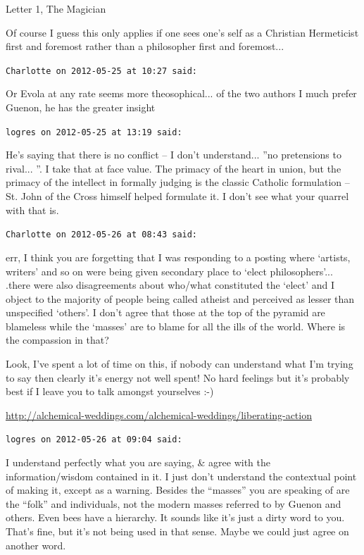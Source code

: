 \begin{footnotesize}
\begin{sffamily}
Letter 1, The Magician

Of course I guess this only applies if one sees one's self as a Christian Hermeticist first and foremost rather than a philosopher first and foremost...

\hfill

\texttt{Charlotte on 2012-05-25 at 10:27 said:}

Or Evola at any rate seems more theosophical... of the two authors I much prefer Guenon, he has the greater insight

\hfill

\texttt{logres on 2012-05-25 at 13:19 said:}

He's saying that there is no conflict -- I don't understand... ''no pretensions to rival... ''. I take that at face value. The primacy of the heart in union, but the primacy of the intellect in formally judging is the classic Catholic formulation -- St. John of the Cross himself helped formulate it. I don't see what your quarrel with that is.

\hfill

\texttt{Charlotte on 2012-05-26 at 08:43 said:}

err, I think you are forgetting that I was responding to a posting where `artists, writers' and so on were being given secondary place to `elect philosophers'... .there were also disagreements about who/what constituted the `elect' and I object to the majority of people being called atheist and perceived as lesser than unspecified `others'. I don't agree that those at the top of the pyramid are blameless while the `masses' are to blame for all the ills of the world. Where is the compassion in that?

Look, I've spent a lot of time on this, if nobody can understand what I'm trying to say then clearly it's energy not well spent! No hard feelings but it's probably best if I leave you to talk amongst yourselves :-)

\url{http://alchemical-weddings.com/alchemical-weddings/liberating-action}


\hfill

\texttt{logres on 2012-05-26 at 09:04 said:}

I understand perfectly what you are saying, \& agree with the information/wisdom contained in it. I just don't understand the contextual point of making it, except as a warning. Besides the ``masses'' you are speaking of are the ``folk'' and individuals, not the modern masses referred to by Guenon and others. Even bees have a hierarchy. It sounds like it's just a dirty word to you. That's fine, but it's not being used in that sense. Maybe we could just agree on another word.


\end{sffamily}
\end{footnotesize}

